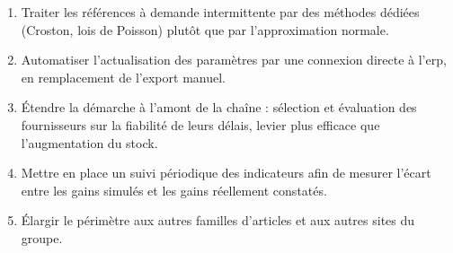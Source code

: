 \begin{enumerate}
  \item Traiter les références à demande intermittente par des méthodes
    dédiées (Croston, lois de Poisson) plutôt que par l'approximation normale.
  \item Automatiser l'actualisation des paramètres par une connexion directe à
    l'\gls{erp}, en remplacement de l'export manuel.
  \item Étendre la démarche à l'amont de la chaîne : sélection et évaluation des
    fournisseurs sur la fiabilité de leurs délais, levier plus efficace que
    l'augmentation du stock.
  \item Mettre en place un suivi périodique des indicateurs afin de mesurer
    l'écart entre les gains simulés et les gains réellement constatés.
  \item Élargir le périmètre aux autres familles d'articles et aux autres sites
    du groupe.
\end{enumerate}
